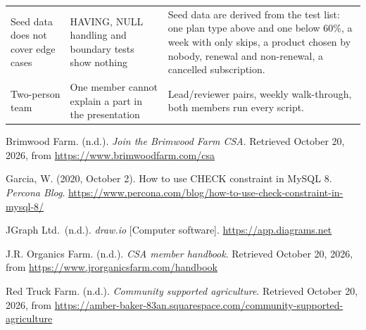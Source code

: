 \begin{xltabular}{\linewidth}{@{}YYY@{}}
Seed data does not cover edge cases & HAVING, NULL handling and boundary tests show nothing & Seed data are derived from the test list: one plan type above and one below 60\%, a week with only skips, a product chosen by nobody, renewal and non-renewal, a cancelled subscription. \\
Two-person team & One member cannot explain a part in the presentation & Lead/reviewer pairs, weekly walk-through, both members run every script. \\
\end{xltabular}

\clearpage
{}
{}
\begin{thebibliography}{}
  \bibitem
    Brimwood Farm. (n.d.). \emph{Join the Brimwood Farm CSA}.
    Retrieved October 20, 2026, from \url{https://www.brimwoodfarm.com/csa}

  \bibitem
    Garcia, W. (2020, October 2). How to use CHECK constraint in MySQL 8.
    \emph{Percona Blog}.
    \url{https://www.percona.com/blog/how-to-use-check-constraint-in-mysql-8/}

  \bibitem
    JGraph Ltd.\ (n.d.). \emph{draw.io} [Computer software].
    \url{https://app.diagrams.net}

  \bibitem
    J.R. Organics Farm. (n.d.). \emph{CSA member handbook}.
    Retrieved October 20, 2026, from \url{https://www.jrorganicsfarm.com/handbook}


  \bibitem
    Red Truck Farm. (n.d.). \emph{Community supported agriculture}.
    Retrieved October 20, 2026, from
    \url{https://amber-baker-83an.squarespace.com/community-supported-agriculture}
\end{thebibliography}

